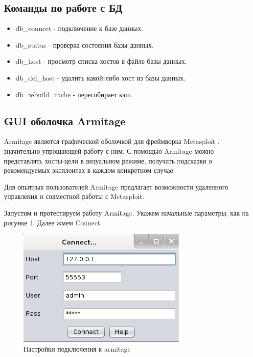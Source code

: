 \documentclass[11pt, a4paper]{article}		%
\begin{document}

\subsection{Команды по работе с БД}

\begin{itemize}

\item db\_connect - подключение к базе данных.

\item db\_status - проверка состояния базы данных.

\item db\_host - просмотр списка хостов в файле базы данных.

\item db\_del\_host - удалить какой-либо хост из базы данных.

\item db\_rebuild\_cache - пересобирает кэш.

\end{itemize}



\subsection{GUI оболочка Armitage}

Armitage является графической оболочкой для фреймворка Metasploit , значительно упрощающей работу с ним. С помощью Armitage можно представлять хосты-цели в визуальном режиме, получать подсказки о рекомендуемых эксплоитах в каждом конкретном случае.

Для опытных пользователей Armitage предлагает возможности удаленного управления и совместной работы с Metasploit.

Запустим и протестируем работу Armitage. Укажем начальные параметры, как на рисунке 1. Далее жмем Connect.

\begin{figure}[h!]
\centering
\includegraphics[scale=0.8]{res/armitage}
\caption{Настройки подключения к armitage}
\end{figure}
\end{document}
